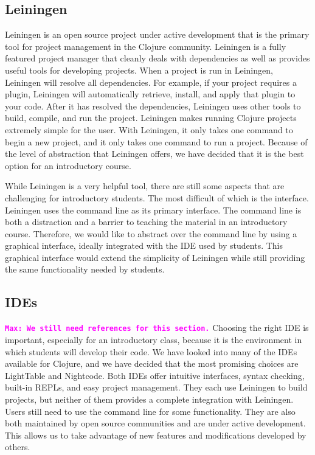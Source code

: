 \documentclass[12pt]{article}
\newcommand{\comment}[1]{{\bf \tt  {#1}}}
\newcommand{\mmcomment}[1]{\textcolor{magenta}{\comment{Max: {#1}}}}
\begin{document}
\subsection{Leiningen}
Leiningen is an open source project under active development that is the primary tool for project management in the Clojure community\cite{LeinGitHub}. Leiningen is a fully featured project manager that cleanly deals with dependencies as well as provides useful tools for developing projects. When a project is run in Leiningen, Leiningen will resolve all dependencies. For example, if your project requires a plugin, Leiningen will automatically retrieve, install, and apply that plugin to your code. After it has resolved the dependencies, Leiningen uses other tools to build, compile, and run the project. Leiningen makes running Clojure projects extremely simple for the user. With Leiningen, it only takes one command to begin a new project, and it only takes one command to run a project. Because of the level of abstraction that Leiningen offers, we have decided that it is the best option for an introductory course.

While Leiningen is a very helpful tool, there are still some aspects that are challenging for introductory students. The most difficult of which is the interface. Leiningen uses the command line as its primary interface. The command line is both a distraction and a barrier to teaching the material in an introductory course. Therefore, we would like to abstract over the command line by using a graphical interface, ideally integrated with the IDE used by students. This graphical interface would extend the simplicity of Leiningen while still providing the same functionality needed by students.

\subsection{IDEs}
\mmcomment{We still need references for this section.}
Choosing the right IDE is important, especially for an introductory class, because it is the environment in which students will develop their code. We have looked into many of the IDEs available for Clojure, and we have decided that the most promising choices are LightTable and Nightcode. Both IDEs offer intuitive interfaces, syntax checking, built-in REPLs, and easy project management. They each use Leiningen to build projects, but neither of them provides a complete integration with Leiningen. Users still need to use the command line for some functionality. They are also both maintained by open source communities and are under active development. This allows us to take advantage of new features and modifications developed by others.  
\end{document}
